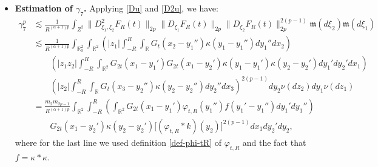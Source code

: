 \documentclass[12pt]{article}
\def\bR{\mathbb{R}}
\newcommand{\les}{\lesssim}
\def\k{\kappa}
\newcommand{\fm}{\mathfrak{m}}
\begin{document}
\begin{itemize}
\item {\bf Estimation of $\gamma_7$.} Applying \eqref{Du} and \eqref{D2u}, we have:
\begin{align*}
\gamma_7^p & \les \frac{1}{R^{(\alpha+1)p}} \int_{Z^2} 
\|D^2_{\xi_1,\xi_2} F_R(t) \|_{2p}\|D_{\xi_1}F_R(t) \|_{2p}\|D_{\xi_2}F_R(t) \|^{2(p-1)}_{2p}\fm(d\xi_2)\fm(d\xi_1)\\
& \les \frac{1}{R^{(\alpha+1)p}} \int_{\bR_0^2}\int_{\bR^2}   \left(|z_1| \int_{-R}^R \int_{\bR} G_t(x_2-y_1'') \k(y_1-y_1'') dy_1'' dx_2\right) \\
& \qquad
\left(|z_1 z_2| \int_{-R}^R \int_{\bR^2} G_{2t}(x_1-y_1')G_{2t}(x_1-y_2') \k(y_1-y_1')\k(y_2-y_2') dy_1' dy_2' dx_1 \right) \\
& \qquad 
\left(|z_2| \int_{-R}^R \int_{\bR} G_t(x_3-y_2'') \k(y_2-y_2'') dy_2'' dx_3\right)^{2(p-1)} dy_2 \nu(dz_2) dy_1 \nu(dz_1)\\
& = \frac{m_2m_{2p-1}}{R^{(\alpha+1)p}} \int_{\bR^2} \int_{-R}^{R} \left( \int_{\bR^2} G_{2t}(x_1-y_1') \varphi_{t,R}(y_1'') f(y_1'-y_1'')   dy_1' dy_1'' \right)\\
& \qquad  G_{2t}(x_1-y_2')\k(y_2-y_2') \big[ (\varphi_{t,R} *k)(y_2)\big]^{2(p-1)} dx_1 dy_2' dy_2,
\end{align*}
where for the last line we used definition \eqref{def-phi-tR} of $\varphi_{t,R}$ and the fact that $f=\k *\k$. 


\end{itemize}
\end{document}
